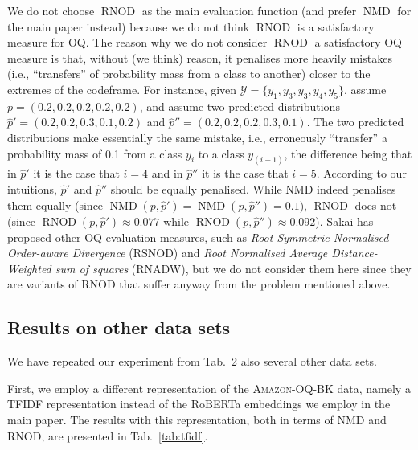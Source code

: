 \documentclass[10pt,a4paper]{article}
\DeclareMathOperator{\nmd}{NMD}
\DeclareMathOperator{\rnod}{RNOD}
\begin{document}
We do not choose $\rnod$ as the main evaluation function (and prefer
$\nmd$ for the main paper instead) because we do not think $\rnod$ is
a satisfactory measure for OQ. The reason why we do not consider
$\rnod$ a satisfactory OQ measure is that, without (we think) reason,
it penalises more heavily mistakes (i.e., ``transfers'' of probability
mass from a class to another) closer to the extremes of the
codeframe. For instance, given
$\mathcal{Y}=\{y_{1},y_{3},y_{3}, y_{4},y_{5}\}$, assume
$p=(0.2,0.2,0.2,0.2,0.2)$, and assume two predicted distributions
$\hat{p}'=(0.2,0.2,0.3,0.1,0.2)$ and
$\hat{p}''=(0.2,0.2,0.2,0.3,0.1)$. The two predicted distributions
make essentially the same mistake, i.e., erroneously ``transfer'' a
probability mass of 0.1 from a class $y_{i}$ to a class $y_{(i-1)}$,
the difference being that in $\hat{p}'$ it is the case that $i=4$ and
in $\hat{p}''$ it is the case that $i=5$. According to our intuitions,
$\hat{p}'$ and $\hat{p}''$ should be equally penalised. While NMD
indeed penalises them equally (since
$\nmd(p,\hat{p}')=\nmd(p,\hat{p}'')=0.1$), $\rnod$ does not (since
$\rnod(p,\hat{p}')\approx 0.077$ while
$\rnod(p,\hat{p}'')\approx 0.092$). Sakai \cite{Sakai:2021lp} has proposed
other OQ evaluation measures, such as \emph{Root Symmetric Normalised
Order-aware Divergence} (RSNOD) and \emph{Root Normalised Average
Distance-Weighted sum of squares} (RNADW), but we do not consider them
here since they are variants of RNOD that suffer anyway from the
problem mentioned above.




%   

%   

\subsection{Results on other data sets}

We have repeated our experiment from Tab.~2 also several other data sets.

First, we employ a different representation of the \textsc{Amazon-OQ-BK} data, namely a TFIDF representation instead of the RoBERTa embeddings we employ in the main paper. The results with this representation, both in terms of NMD and RNOD, are presented in Tab.~\ref{tab:tfidf}.
\end{document}
